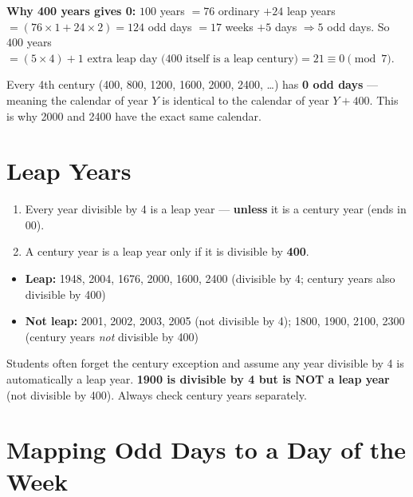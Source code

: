 \documentclass[11pt]{article}
\begin{document}
\textbf{Why 400 years gives 0:} $100$ years $= 76$ ordinary $+ 24$ leap years
$= (76 \times 1 + 24 \times 2) = 124$ odd days $= 17$ weeks $+ 5$ days $\Rightarrow 5$ odd days.
So $400$ years $= (5 \times 4) + 1 \text{ extra leap day (400 itself is a leap century)} = 21 \equiv 0 \pmod 7$.

\begin{tipbox}[Pattern]
Every 4th century (400, 800, 1200, 1600, 2000, 2400, \ldots) has \textbf{0 odd days} --- meaning the
calendar of year $Y$ is identical to the calendar of year $Y + 400$. This is why 2000 and 2400 have
the exact same calendar.
\end{tipbox}

\section{Leap Years}

\begin{formulabox}
\begin{enumerate}[leftmargin=1.4em]
  \item Every year divisible by 4 is a leap year --- \textbf{unless} it is a century year (ends in 00).
  \item A century year is a leap year only if it is divisible by \textbf{400}.
\end{enumerate}
\end{formulabox}

\begin{examplebox}
\begin{itemize}[leftmargin=1.4em]
  \item \textbf{Leap:} 1948, 2004, 1676, 2000, 1600, 2400 (divisible by 4; century years also divisible by 400)
  \item \textbf{Not leap:} 2001, 2002, 2003, 2005 (not divisible by 4); 1800, 1900, 2100, 2300
    (century years \emph{not} divisible by 400)
\end{itemize}
\end{examplebox}

\begin{warnbox}
Students often forget the century exception and assume any year divisible by 4 is automatically a
leap year. \textbf{1900 is divisible by 4 but is NOT a leap year} (not divisible by 400). Always check
century years separately.
\end{warnbox}

\section{Mapping Odd Days to a Day of the Week}
\end{document}
